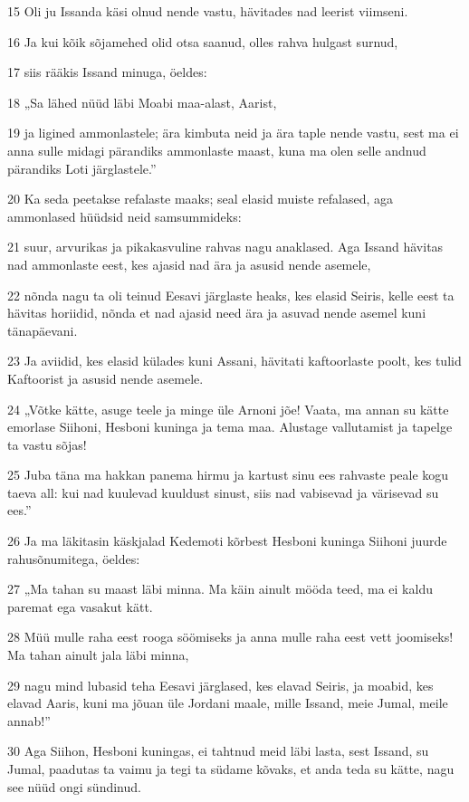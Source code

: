 \par 15 Oli ju Issanda käsi olnud nende vastu, hävitades nad leerist viimseni.
\par 16 Ja kui kõik sõjamehed olid otsa saanud, olles rahva hulgast surnud,
\par 17 siis rääkis Issand minuga, öeldes:
\par 18 „Sa lähed nüüd läbi Moabi maa-alast, Aarist,
\par 19 ja ligined ammonlastele; ära kimbuta neid ja ära taple nende vastu, sest ma ei anna sulle midagi pärandiks ammonlaste maast, kuna ma olen selle andnud pärandiks Loti järglastele.”
\par 20 Ka seda peetakse refalaste maaks; seal elasid muiste refalased, aga ammonlased hüüdsid neid samsummideks:
\par 21 suur, arvurikas ja pikakasvuline rahvas nagu anaklased. Aga Issand hävitas nad ammonlaste eest, kes ajasid nad ära ja asusid nende asemele,
\par 22 nõnda nagu ta oli teinud Eesavi järglaste heaks, kes elasid Seiris, kelle eest ta hävitas horiidid, nõnda et nad ajasid need ära ja asuvad nende asemel kuni tänapäevani.
\par 23 Ja aviidid, kes elasid külades kuni Assani, hävitati kaftoorlaste poolt, kes tulid Kaftoorist ja asusid nende asemele.
\par 24 „Võtke kätte, asuge teele ja minge üle Arnoni jõe! Vaata, ma annan su kätte emorlase Siihoni, Hesboni kuninga ja tema maa. Alustage vallutamist ja tapelge ta vastu sõjas!
\par 25 Juba täna ma hakkan panema hirmu ja kartust sinu ees rahvaste peale kogu taeva all: kui nad kuulevad kuuldust sinust, siis nad vabisevad ja värisevad su ees.”
\par 26 Ja ma läkitasin käskjalad Kedemoti kõrbest Hesboni kuninga Siihoni juurde rahusõnumitega, öeldes:
\par 27 „Ma tahan su maast läbi minna. Ma käin ainult mööda teed, ma ei kaldu paremat ega vasakut kätt.
\par 28 Müü mulle raha eest rooga söömiseks ja anna mulle raha eest vett joomiseks! Ma tahan ainult jala läbi minna,
\par 29 nagu mind lubasid teha Eesavi järglased, kes elavad Seiris, ja moabid, kes elavad Aaris, kuni ma jõuan üle Jordani maale, mille Issand, meie Jumal, meile annab!”
\par 30 Aga Siihon, Hesboni kuningas, ei tahtnud meid läbi lasta, sest Issand, su Jumal, paadutas ta vaimu ja tegi ta südame kõvaks, et anda teda su kätte, nagu see nüüd ongi sündinud.
